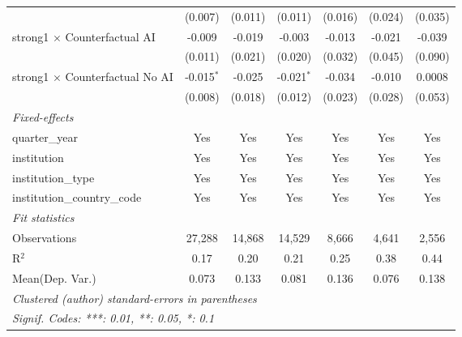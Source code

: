 \begin{tabular}{lcccccc}
                                          & (0.007)       & (0.011)       & (0.011)        & (0.016)       & (0.024)       & (0.035)\\   
   strong1 $\times$ Counterfactual AI     & -0.009        & -0.019        & -0.003         & -0.013        & -0.021        & -0.039\\   
                                          & (0.011)       & (0.021)       & (0.020)        & (0.032)       & (0.045)       & (0.090)\\   
   strong1 $\times$ Counterfactual No AI  & -0.015$^{*}$  & -0.025        & -0.021$^{*}$   & -0.034        & -0.010        & 0.0008\\   
                                          & (0.008)       & (0.018)       & (0.012)        & (0.023)       & (0.028)       & (0.053)\\   
   \midrule
   \emph{Fixed-effects}\\
   quarter\_year                          & Yes           & Yes           & Yes            & Yes           & Yes           & Yes\\  
   institution                            & Yes           & Yes           & Yes            & Yes           & Yes           & Yes\\  
   institution\_type                      & Yes           & Yes           & Yes            & Yes           & Yes           & Yes\\  
   institution\_country\_code             & Yes           & Yes           & Yes            & Yes           & Yes           & Yes\\  
   \midrule
   \emph{Fit statistics}\\
   Observations                           & 27,288        & 14,868        & 14,529         & 8,666         & 4,641         & 2,556\\  
   R$^2$                                  & 0.17          & 0.20          & 0.21           & 0.25          & 0.38          & 0.44\\  
Mean(Dep. Var.) & 0.073 & 0.133 & 0.081 & 0.136 & 0.076 & 0.138 \\
   \midrule \midrule
   \multicolumn{7}{l}{\emph{Clustered (author) standard-errors in parentheses}}\\
   \multicolumn{7}{l}{\emph{Signif. Codes: ***: 0.01, **: 0.05, *: 0.1}}\\
\end{tabular}
\par\endgroup
